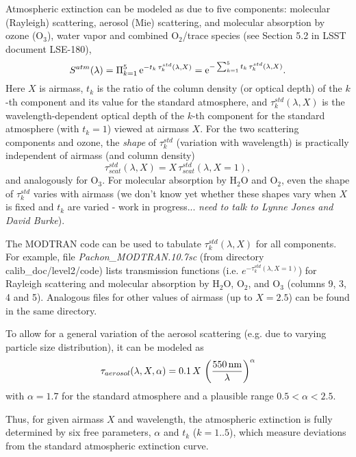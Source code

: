 \documentclass[12pt,preprint]{aastex}
\begin{document}
Atmospheric extinction can be modeled as due to five components: molecular (Rayleigh) scattering, 
aerosol (Mie) scattering, and molecular absorption by ozone (O$_3$), water vapor and combined
O$_2$/trace species (see Section 5.2 in LSST document LSE-180),
\begin{equation}
\label{eq:atmModel}
 S^{atm}(\lambda) = \Pi_{k=1}^5 \, {\rm e}^{- t_k \, \tau_k^{std}(\lambda, X)} 
                           =  {\rm e}^{-\sum_{k=1}^5  t_k \, \tau_k^{std}(\lambda, X)}. 
\end{equation}
Here $X$ is airmass, $t_k$ is the ratio of the column density (or optical depth) of the $k$-th 
component and its value for the standard atmosphere, and $\tau_k^{std}(\lambda, X)$ is the 
wavelength-dependent optical depth of the $k$-th component for the standard 
atmosphere (with $t_k=1$) viewed at airmass $X$. For the two scattering components and ozone, the {\it shape} of 
$\tau_k^{std}$ (variation with wavelength) is practically independent of airmass (and column
density) 
\begin{equation}
         \tau_{scat}^{std}(\lambda, X) = X \, \tau_{scat}^{std}(\lambda, X=1),
\end{equation}
and analogously for O$_3$. For molecular absorption by H$_2$O and O$_2$, even the 
shape of $\tau_k^{std}$ varies with airmass (we don't know yet whether these shapes
vary when $X$ is fixed and $t_k$ are varied - work in progress... {\it need to talk to
Lynne Jones and David Burke}). 

The MODTRAN code can be used to tabulate $\tau_k^{std}(\lambda, X)$ for all components. 
For example, file {\it Pachon\_MODTRAN.10.7sc}  (from directory calib\_doc/level2/code)
lists transmission functions (i.e. $e^{-\tau_k^{std}(\lambda, X=1)}$) for Rayleigh scattering  and 
molecular absorption by H$_2$O, O$_2$, and O$_3$ (columns 9, 3, 4 and 5). Analogous 
files for other values of airmass (up to $X=2.5$) can be found in the same directory.

To allow for a general variation of the aerosol scattering (e.g. due to varying particle 
size distribution), it can be modeled as 
\begin{equation}
      \tau_{aerosol}(\lambda, X, \alpha) = 0.1 \, X \, \left({550 \, {\rm nm} \over \lambda} \right)^\alpha
\end{equation}
with $\alpha=1.7$ for the standard atmosphere and a plausible range $0.5 < \alpha < 2.5$. 

Thus, for given airmass $X$ and wavelength, the atmospheric extinction is fully determined
by six free parameters, $\alpha$ and $t_k$ ($k=1..5$), which measure deviations from the
standard atmospheric extinction curve. 
\end{document}
